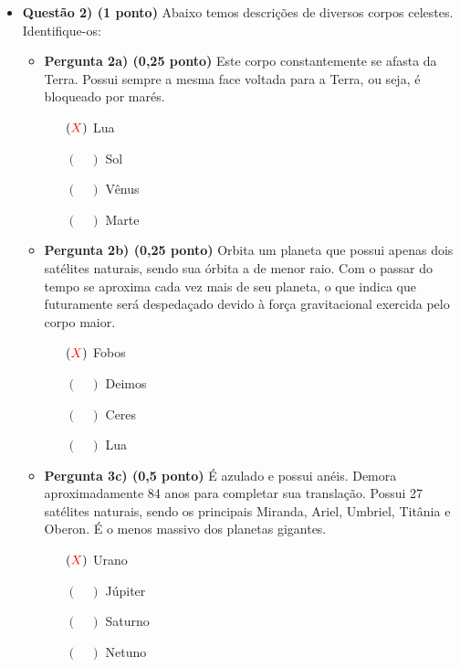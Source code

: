 \documentclass[a4paper, 12pt]{article}
\newcommand{\red}[1]{\textcolor{red}{#1}}
\begin{document}
\begin{flushleft}
\begin{itemize}
            \item \textbf{Questão 2) (1 ponto)} Abaixo temos descrições de diversos corpos celestes. Identifique-os:
                \begin{itemize}
                    \item \textbf{Pergunta 2a) (0,25 ponto)} Este corpo constantemente se afasta da Terra. Possui sempre a mesma face voltada para a Terra, ou seja, é bloqueado por marés.
                        \begin{itemize}
                            \item[$(\red{X})$] Lua
                            \item[$(\quad)$] Sol
                            \item[$(\quad)$] Vênus
                            \item[$(\quad)$] Marte
                        \end{itemize}
                    \item \textbf{Pergunta 2b) (0,25 ponto)} Orbita um planeta que possui apenas dois satélites naturais, sendo sua órbita a de menor raio. Com o passar do tempo se aproxima cada vez mais de seu planeta, o que indica que futuramente será despedaçado devido à força gravitacional exercida pelo corpo maior.
                        \begin{itemize}
                            \item[$(\red{X})$] Fobos
                            \item[$(\quad)$] Deimos
                            \item[$(\quad)$] Ceres
                            \item[$(\quad)$] Lua
                        \end{itemize}
                    \item \textbf{Pergunta 3c) (0,5 ponto)} É azulado e possui anéis. Demora aproximadamente 84 anos para completar sua translação. Possui 27 satélites naturais, sendo os principais Miranda, Ariel, Umbriel, Titânia e Oberon. É o menos massivo dos planetas gigantes.
                        \begin{itemize}
                            \item[$(\red{X})$] Urano
                            \item[$(\quad)$] Júpiter
                            \item[$(\quad)$] Saturno
                            \item[$(\quad)$] Netuno
                        \end{itemize}
                \end{itemize}


\end{itemize}
\end{flushleft}
\end{document}
